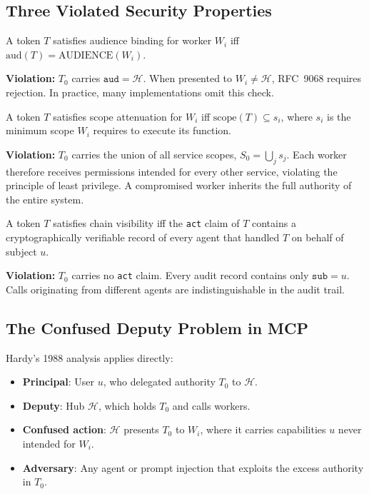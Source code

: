 \documentclass[journal]{IEEEtran}
\begin{document}
\subsection{Three Violated Security Properties}

\begin{definition}
A token $T$ satisfies audience binding for worker $W_i$ iff
$\mathrm{aud}(T) = \mathrm{AUDIENCE}(W_i)$.
\end{definition}

\textbf{Violation:} $T_0$ carries $\texttt{aud} = \mathcal{H}$. When presented
to $W_i \neq \mathcal{H}$, RFC~9068 requires rejection. In practice, many
implementations omit this check.

\begin{definition}
A token $T$ satisfies scope attenuation for $W_i$ iff
$\mathrm{scope}(T) \subseteq s_i$, where $s_i$ is the minimum scope $W_i$
requires to execute its function.
\end{definition}

\textbf{Violation:} $T_0$ carries the union of all service scopes,
$S_0 = \bigcup_j s_j$. Each worker therefore receives permissions intended
for every other service, violating the principle of least privilege. A
compromised worker inherits the full authority of the entire system.

\begin{definition}
A token $T$ satisfies chain visibility iff the \texttt{act} claim of $T$
contains a cryptographically verifiable record of every agent that handled $T$
on behalf of subject $u$.
\end{definition}

\textbf{Violation:} $T_0$ carries no \texttt{act} claim. Every audit record
contains only $\texttt{sub} = u$. Calls originating from different agents are
indistinguishable in the audit trail.

\subsection{The Confused Deputy Problem in MCP}

Hardy's 1988 analysis \cite{hardy1988} applies directly:

\begin{itemize}
  \item \textbf{Principal}: User $u$, who delegated authority $T_0$ to
        $\mathcal{H}$.
  \item \textbf{Deputy}: Hub $\mathcal{H}$, which holds $T_0$ and calls workers.
  \item \textbf{Confused action}: $\mathcal{H}$ presents $T_0$ to $W_i$, where
        it carries capabilities $u$ never intended for $W_i$.
  \item \textbf{Adversary}: Any agent or prompt injection that exploits the
        excess authority in $T_0$.
\end{itemize}
\end{document}
